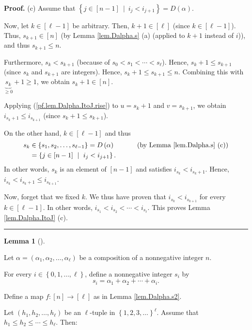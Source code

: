 \documentclass[numbers=enddot,12pt,final,onecolumn,notitlepage,abstracton]{scrartcl}
\theoremstyle{definition}
\newtheorem{lem}[theo]{Lemma}
\newenvironment{lemma}[1][]
{\begin{lem}[#1]\begin{leftbar}}
{\end{leftbar}\end{lem}}
\newenvironment{proof}[1][Proof]{\noindent\textbf{#1.} }{\ \rule{0.5em}{0.5em}}
\newenvironment{verlong}{}{}
\begin{document}
\begin{verlong}
\begin{footnotesize}
\begin{proof}
(c) Assume that $\left\{  j\in\left[  n-1\right]  \ \mid\ i_{j}<i_{j+1}%
\right\}  =D\left(  \alpha\right)  $.

Now, let $k\in\left[  \ell-1\right]  $ be arbitrary. Then, $k+1\in\left[
\ell\right]  $ (since $k\in\left[  \ell-1\right]  $). Thus, $s_{k+1}\in\left[
n\right]  $ (by Lemma \ref{lem.Dalpha.s} (a) (applied to $k+1$ instead of
$i$)), and thus $s_{k+1}\leq n$.

Furthermore, $s_{k}<s_{k+1}$ (because of $s_{0}<s_{1}<\cdots<s_{\ell}$).
Hence, $s_{k}+1\leq s_{k+1}$ (since $s_{k}$ and $s_{k+1}$ are integers).
Hence, $s_{k}+1\leq s_{k+1}\leq n$. Combining this with $\underbrace{s_{k}%
}_{\geq0}+1\geq1$, we obtain $s_{k}+1\in\left[  n\right]  $.

Applying (\ref{pf.lem.Dalpha.ItoJ.rise}) to $u=s_{k}+1$ and $v=s_{k+1}$, we
obtain $i_{s_{k}+1}\leq i_{s_{k+1}}$ (since $s_{k}+1\leq s_{k+1}$).

On the other hand, $k\in\left[  \ell-1\right]  $ and thus
\begin{align*}
s_{k}  &  \in\left\{  s_{1},s_{2},\ldots,s_{\ell-1}\right\}  =D\left(
\alpha\right)  \ \ \ \ \ \ \ \ \ \ \left(  \text{by Lemma \ref{lem.Dalpha.s}
(c)}\right) \\
&  =\left\{  j\in\left[  n-1\right]  \ \mid\ i_{j}<i_{j+1}\right\}  .
\end{align*}
In other words, $s_{k}$ is an element of $\left[  n-1\right]  $ and satisfies
$i_{s_{k}}<i_{s_{k}+1}$. Hence, $i_{s_{k}}<i_{s_{k}+1}\leq i_{s_{k+1}}$.

Now, forget that we fixed $k$. We thus have proven that $i_{s_{k}}<i_{s_{k+1}%
}$ for every $k\in\left[  \ell-1\right]  $. In other words, $i_{s_{1}%
}<i_{s_{2}}<\cdots<i_{s_{\ell}}$. This proves Lemma \ref{lem.Dalpha.ItoJ} (c).
\end{proof}

\begin{lemma}
\label{lem.Dalpha.JtoI}Let $\alpha=\left(  \alpha_{1},\alpha_{2},\ldots
,\alpha_{\ell}\right)  $ be a composition of a nonnegative integer $n$.

For every $i\in\left\{  0,1,\ldots,\ell\right\}  $, define a nonnegative
integer $s_{i}$ by
\[
s_{i}=\alpha_{1}+\alpha_{2}+\cdots+\alpha_{i}.
\]


Define a map $f:\left[  n\right]  \rightarrow\left[  \ell\right]  $ as in
Lemma \ref{lem.Dalpha.s2}.

Let $\left(  h_{1},h_{2},\ldots,h_{\ell}\right)  $ be an $\ell$-tuple in
$\left\{  1,2,3,\ldots\right\}  ^{\ell}$. Assume that $h_{1}\leq h_{2}%
\leq\cdots\leq h_{\ell}$. Then:


\end{lemma}
\end{footnotesize}
\end{verlong}
\end{document}

